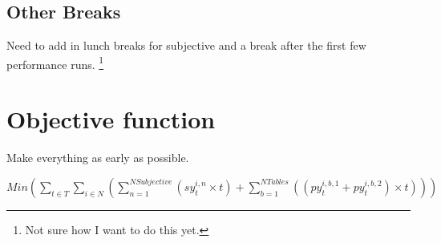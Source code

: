 \documentclass[letterpaper,11pt]{report}
\newcommand{\doccomment}[3]%
{\marginpar{\textcolor{#2}{\bf #1}}%
\footnote{{\color{#2}#3}}%
}
\newcommand{\doccomment}[3]{}
\newcommand{\jpscomment}[1]%
{\doccomment{SCHEWE}{Bittersweet}{#1}}
\begin{document}
\subsection{Other Breaks}
Need to add in lunch breaks for subjective and a break after the first few
performance runs. \jpscomment{Not sure how I want to do this yet.}

\section{Objective function}
Make everything as early as possible.

$Min ( 
\sum\limits_{t \in T}
  \sum\limits_{i \in N} (
    \sum\limits_{n=1}^{NSubjective}
      ( sy_{t}^{i,n} \times t )
  + \sum\limits_{b=1}^{NTables} ( ( py_{t}^{i,b,1} + py_{t}^{i,b,2} )
  \times t)
  )
) $
\end{document}
